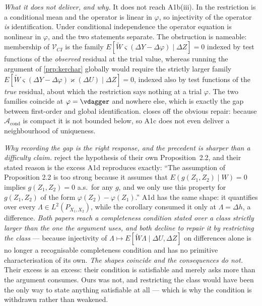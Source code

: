 \begin{remark}
\emph{What it does not deliver, and why.} It does not reach A1b(iii). In \citet{feve2014} the
restriction is a conditional mean and the operator is linear in $\varphi$, so injectivity of the operator
\emph{is} identification. Under conditional independence the operator equation is nonlinear in $\varphi$,
and the two statements separate. The obstruction is nameable: membership of $\mathcal V_{CI}$ is the
family $E[\widetilde W\varsigma(\Delta Y-\Delta\varphi)\mid\Delta Z]=0$ indexed by test functions of the
\emph{observed} residual at the trial value, whereas running the argument of \cref{prp:kerchar} globally
would require the strictly larger family
$E[\widetilde W\varsigma(\Delta Y-\Delta\varphi)\varkappa(\Delta U)\mid\Delta Z]=0$, indexed also by test
functions of the \emph{true} residual, about which the restriction says nothing at a trial $\varphi$. The
two families coincide at $\varphi=\vdagger$ and nowhere else, which is exactly the gap between
first-order and global identification.  closes off the obvious repair: because
$\mathcal A_{\mathrm{cond}}$ is compact it is not bounded below, so A1c does not even deliver a
neighbourhood of uniqueness.

\emph{Why recording the gap is the right response, and the precedent is sharper than a difficulty claim.}
\citet{feve2014} reject the hypothesis of their own Proposition~2.2, and their stated reason is the
excess A1d reproduces exactly: ``The assumption of Proposition 2.2 is too strong because it assumes that
$E(g(Z_1,Z_2)\mid W)=0$ implies $g(Z_1,Z_2)=0$ a.s.\ for any $g$, and we only use this property for
$g(Z_1,Z_2)$ of the form $\varphi(Z_2)-\varphi(Z_1)$.'' A1d has the same shape: it quantifies over every
$\Lambda\in L^{2}(P_{X_1,X_2})$, while the corollary consumed it only at $\Lambda=\Delta h$, a
difference. \emph{Both papers reach a completeness condition stated over a class strictly larger than the
one the argument uses, and both decline to repair it by restricting the class} --- because injectivity of
$\Lambda\mapsto E[\widetilde W\Lambda\mid\Delta U,\Delta Z]$ on differences alone is no longer a
recognisable completeness condition and has no primitive characterisation of its own.
\emph{The shapes coincide and the consequences do not.} Their excess is an excess: their condition is
satisfiable and merely asks more than the argument consumes. Ours was not, and restricting the class
would have been the only way to state anything satisfiable at all --- which is why the condition is
withdrawn rather than weakened.


\end{remark}

